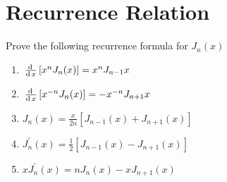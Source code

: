 \documentclass[../main-sheet.tex]{subfiles}
\begin{document}
\section{Recurrence Relation}
\begin{prob}
    Prove the following recurrence formula for $ J_n(x) $
    \begin{enumerate}[label={(\roman*)}]
        \item $ \,\frac{\mathrm{d}\,}{\mathrm{d}\,x}\left[ x^nJ_n(x)\right]=x^n J_{n-1}x  $
        \item $ \,\frac{\mathrm{d}\,}{\mathrm{d}\,x}\left[ x^{-n}J_n(x)\right]=-x^{-n} J_{n+1}x  $
        \item $ J_n(x)=\frac{x}{2n}\left[ J_{n-1}(x)+J_{n+1}(x) \right] $
        \item $ J_n^{'}(x)=\frac{1}{2}\left[ J_{n-1}(x)-J_{n+1}(x) \right] $
        \item $ xJ_n^{'}(x)=nJ_n(x)-xJ_{n+1}(x) $
    \end{enumerate}
\end{prob}
\end{document}
